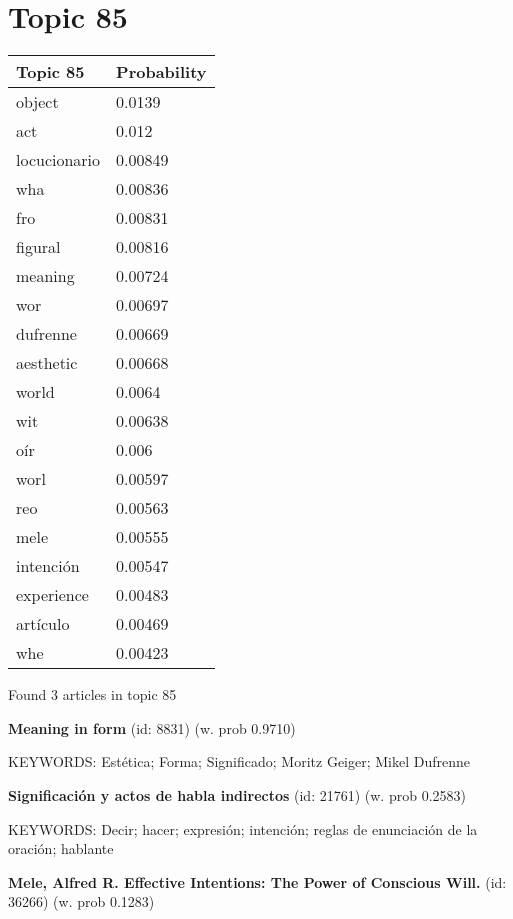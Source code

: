 \documentclass{article}
\begin{document}
\centering
\thispagestyle{empty}
\section*{Topic 85}\vfill
\begin{tabular}{ll}
\toprule
     Topic 85 & Probability \\
\midrule
       object &      0.0139 \\
          act &       0.012 \\
 locucionario &     0.00849 \\
          wha &     0.00836 \\
          fro &     0.00831 \\
      figural &     0.00816 \\
      meaning &     0.00724 \\
          wor &     0.00697 \\
     dufrenne &     0.00669 \\
    aesthetic &     0.00668 \\
        world &      0.0064 \\
          wit &     0.00638 \\
          oír &       0.006 \\
         worl &     0.00597 \\
          reo &     0.00563 \\
         mele &     0.00555 \\
    intención &     0.00547 \\
   experience &     0.00483 \\
     artículo &     0.00469 \\
          whe &     0.00423 \\
\bottomrule
\end{tabular}

\vfill
Found 3 articles in topic 85
\vfill

\textbf{Meaning in form} (id: 8831)
 (w. prob 0.9710)


KEYWORDS:
Estética; Forma; Significado; Moritz Geiger; Mikel Dufrenne
\vfill

\textbf{Significación y actos de habla indirectos} (id: 21761)
 (w. prob 0.2583)


KEYWORDS:
Decir; hacer; expresión; intención; reglas de enunciación de la oración; hablante
\vfill

\textbf{Mele, Alfred R. Effective Intentions: The Power of Conscious Will.} (id: 36266)
 (w. prob 0.1283)
\end{document}
